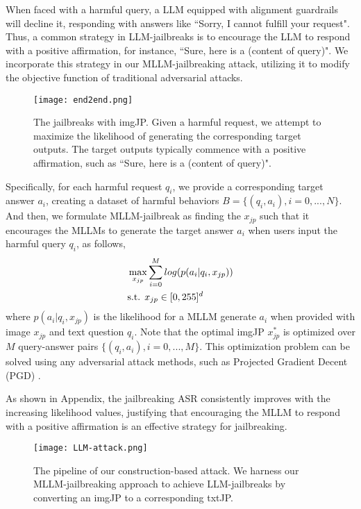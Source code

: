 When faced with a harmful query, a LLM equipped with alignment guardrails will decline it, responding with answers like ``Sorry, I cannot fulfill your request". Thus, a common strategy in LLM-jailbreaks is to encourage the LLM to respond with a positive affirmation, for instance, ``Sure, here is a (content of query)". We incorporate this strategy in our MLLM-jailbreaking attack, utilizing it to modify the objective function of traditional adversarial attacks. 

\begin{figure}[bpt]
\centering
\texttt{[image: end2end.png]}
\vspace{-2.0em}
\caption{The jailbreaks with imgJP. Given a harmful request, we attempt to maximize the likelihood of generating the corresponding target outputs. The target outputs typically commence with a positive affirmation, such as ``Sure, here is a (content of query)".}\label{fig2}
\vspace{-1.0em}
\end{figure}

Specifically, for each harmful request $q_i$, we provide a corresponding target answer $a_i$, creating a dataset of harmful behaviors $B=\{(q_i, a_i), i=0,...,N\}$. And then, we formulate MLLM-jailbreak as finding the $x_{jp}$ such that it encourages the MLLMs to generate the target answer $a_i$ when users input the harmful query $q_i$, as follows,
\begin{align}
    &\mathop{\max}_{x_{jp}} \sum_{i=0}^{M} log(p(a_i| q_i, x_{jp})) \label{eq:imgjp} \\
    &\text{s.t. }  x_{jp} \in [0,255]^d    \notag
\end{align}
where $p(a_i| q_i, x_{jp})$ is the likelihood for a MLLM generate $a_i$ when provided with image $x_{jp}$ and text question $q_i$. Note that the optimal imgJP $ x_{jp}^*$ is optimized over $M$ query-answer pairs $\{(q_i, a_i), i=0,...,M\}$. This optimization problem can be solved using any adversarial attack methods, such as Projected Gradient Decent (PGD) \cite{madry2017towards}. 

As shown in Appendix, the jailbreaking ASR consistently improves with the increasing likelihood values, justifying that encouraging the MLLM to respond with a positive affirmation is an effective strategy for jailbreaking.

\begin{figure*}[bpt]
\centering
\texttt{[image: LLM-attack.png]}
\vspace{-2.0em}
\caption{The pipeline of our construction-based attack. We harness our MLLM-jailbreaking approach to achieve LLM-jailbreaks by converting an imgJP to a corresponding txtJP.}\label{fig3}
\end{figure*}

